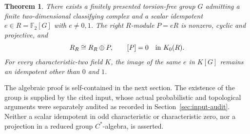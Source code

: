 \documentclass[11pt]{article}
\newtheorem{theorem}{Theorem}
\newcommand{\Ftwo}{\mathbb F_2}
\begin{document}
\begin{theorem}\label{thm:consequence}
There exists a finitely presented torsion-free group $G$ admitting a finite
two-dimensional classifying complex and a scalar idempotent
$e\in R=\Ftwo[G]$ with $e\ne0,1$. The right $R$-module $P=eR$ is nonzero,
cyclic and projective, and
\[
R_R\cong R_R\oplus P,\qquad [P]=0\quad\hbox{in }K_0(R).
\]
For every characteristic-two field $K$, the image of the same $e$ in
$K[G]$ remains an idempotent other than $0$ and $1$.
\end{theorem}

The algebraic proof is self-contained in the next section. The existence
of the group is supplied by the cited input, whose actual probabilistic
and topological arguments were separately audited as recorded in
Section~\ref{sec:input-audit}. Neither a scalar idempotent in odd
characteristic or characteristic zero, nor a projection in a reduced
group $C^*$-algebra, is asserted.
\end{document}
